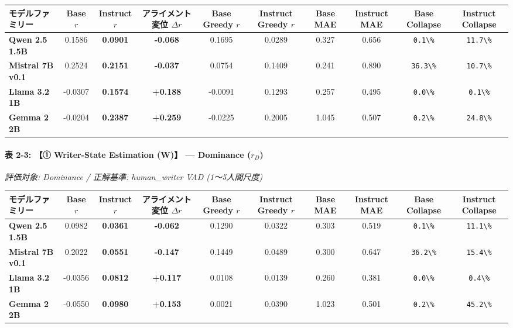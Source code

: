 \begin{center}
\small
\begin{tabular}{lccccccccc}
\toprule
\textbf{モデルファミリー} & \textbf{Base $r$} & \textbf{Instruct $r$} & \textbf{アライメント変位 $\Delta r$} & \textbf{Base Greedy $r$} & \textbf{Instruct Greedy $r$} & \textbf{Base MAE} & \textbf{Instruct MAE} & \textbf{Base Collapse} & \textbf{Instruct Collapse} \\
\midrule
\textbf{Qwen 2.5 1.5B} & 0.1586 & \textbf{0.0901} & \textbf{-0.068} & 0.1695 & 0.0289 & 0.327 & 0.656 & \texttt{0.1\textbackslash{}\%} & \texttt{11.7\textbackslash{}\%} \\
\textbf{Mistral 7B v0.1} & 0.2524 & \textbf{0.2151} & \textbf{-0.037} & 0.0754 & 0.1409 & 0.241 & 0.890 & \texttt{36.3\textbackslash{}\%} & \texttt{10.7\textbackslash{}\%} \\
\textbf{Llama 3.2 1B} & -0.0307 & \textbf{0.1574} & \textbf{+0.188} & -0.0091 & 0.1293 & 0.257 & 0.495 & \texttt{0.0\textbackslash{}\%} & \texttt{0.1\textbackslash{}\%} \\
\textbf{Gemma 2 2B} & -0.0204 & \textbf{0.2387} & \textbf{+0.259} & -0.0225 & 0.2005 & 1.045 & 0.507 & \texttt{0.2\textbackslash{}\%} & \texttt{24.8\textbackslash{}\%} \\
\bottomrule
\end{tabular}
\end{center}


\paragraph{表 2-3: 【① Writer-State Estimation (W)】 — Dominance ($r_D$)}
\textit{評価対象: Dominance / 正解基準: human\_writer VAD (1〜5人間尺度)}

\begin{center}
\small
\begin{tabular}{lccccccccc}
\toprule
\textbf{モデルファミリー} & \textbf{Base $r$} & \textbf{Instruct $r$} & \textbf{アライメント変位 $\Delta r$} & \textbf{Base Greedy $r$} & \textbf{Instruct Greedy $r$} & \textbf{Base MAE} & \textbf{Instruct MAE} & \textbf{Base Collapse} & \textbf{Instruct Collapse} \\
\midrule
\textbf{Qwen 2.5 1.5B} & 0.0982 & \textbf{0.0361} & \textbf{-0.062} & 0.1290 & 0.0322 & 0.303 & 0.519 & \texttt{0.1\textbackslash{}\%} & \texttt{11.1\textbackslash{}\%} \\
\textbf{Mistral 7B v0.1} & 0.2022 & \textbf{0.0551} & \textbf{-0.147} & 0.1449 & 0.0489 & 0.300 & 0.647 & \texttt{36.2\textbackslash{}\%} & \texttt{15.4\textbackslash{}\%} \\
\textbf{Llama 3.2 1B} & -0.0356 & \textbf{0.0812} & \textbf{+0.117} & 0.0108 & 0.0139 & 0.260 & 0.381 & \texttt{0.0\textbackslash{}\%} & \texttt{0.4\textbackslash{}\%} \\
\textbf{Gemma 2 2B} & -0.0550 & \textbf{0.0980} & \textbf{+0.153} & 0.0021 & 0.0390 & 1.023 & 0.501 & \texttt{0.2\textbackslash{}\%} & \texttt{45.2\textbackslash{}\%} \\
\bottomrule
\end{tabular}
\end{center}


